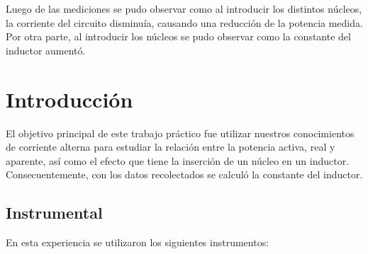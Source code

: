 \documentclass{article}
\begin{document}
Luego de las mediciones se pudo observar como al introducir los distintos núcleos, la corriente del circuito disminuía, causando una reducción de la potencia medida. Por otra parte, al introducir los núcleos se pudo observar como la constante del inductor aumentó.

    \newpage

    \tableofcontents %
    \newpage

    \section{Introducción}

        El objetivo principal de este trabajo práctico fue utilizar nuestros conocimientos de
         corriente alterna para estudiar la relación entre la potencia activa, real y aparente, 
         así como el efecto que tiene la inserción de un núcleo en un inductor.
        Consecuentemente, con los datos recolectados se calculó la constante del inductor.

        \subsection{Instrumental}

        En esta experiencia se utilizaron los siguientes instrumentos:
\end{document}
